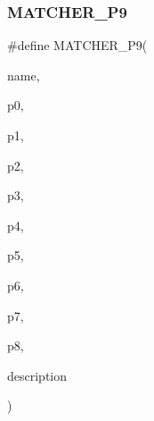 \subsubsection{\texorpdfstring{MATCHER\_P9}{MATCHER\_P9}}
{\footnotesize\ttfamily \#define M\+A\+T\+C\+H\+E\+R\+\_\+\+P9(\begin{DoxyParamCaption}\item[{}]{name,  }\item[{}]{p0,  }\item[{}]{p1,  }\item[{}]{p2,  }\item[{}]{p3,  }\item[{}]{p4,  }\item[{}]{p5,  }\item[{}]{p6,  }\item[{}]{p7,  }\item[{}]{p8,  }\item[{}]{description }\end{DoxyParamCaption})}

